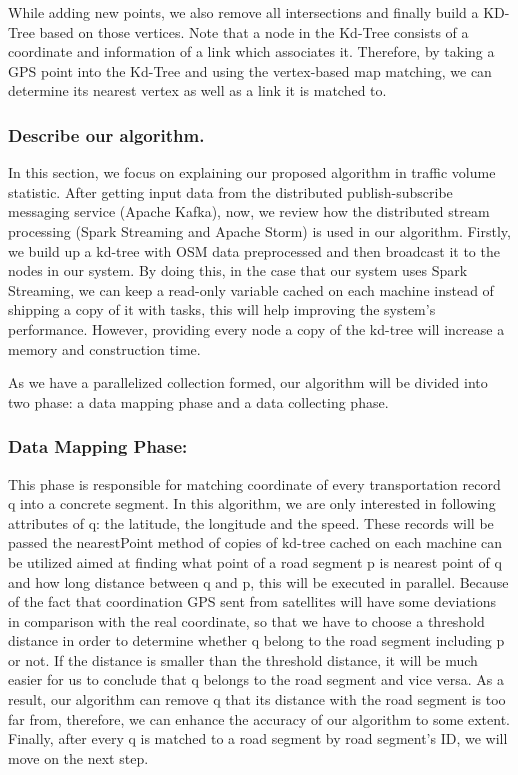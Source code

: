 \documentclass{acm_proc_article-sp}
\begin{document}
While adding new points, we also remove all intersections and finally build a KD-Tree based on those vertices. Note that a node in the Kd-Tree consists of a coordinate and information of a link which associates it. Therefore, by taking a GPS point into the Kd-Tree and using the vertex-based map matching, we can determine its nearest vertex as well as a link it is matched to.
	
\subsubsection{Describe our algorithm.}
		
In this section, we focus on explaining our proposed algorithm in traffic volume statistic. After getting input data from the distributed publish-subscribe messaging service (Apache Kafka), now, we review how the distributed stream processing (Spark Streaming and Apache Storm) is used in our algorithm. Firstly, we build up a kd-tree with OSM data preprocessed and then broadcast it to the nodes in our system. By doing this, in the case that our system uses Spark Streaming, we can keep a read-only variable cached on each machine instead of shipping a copy of it with tasks, this will help improving the system's performance. However, providing every node a copy of the kd-tree will increase a memory and construction time.
	
\setlength{\parindent}{0.7cm} As we have a parallelized collection formed, our algorithm will be divided into two phase: a data mapping phase and a data collecting phase. 

\subsubsection{Data Mapping Phase:} 
This phase is responsible for matching coordinate of every transportation record q into a concrete segment. In this algorithm, we are only interested in following attributes of q: the latitude, the longitude and the speed. These records will be passed the nearestPoint method of copies of kd-tree cached on each machine can be utilized aimed at finding what point of a road segment p is nearest point of q and how long distance between q and p, this will be executed in parallel. Because of the fact that coordination GPS sent from satellites will have some deviations in comparison with the real coordinate, so that we have to choose a threshold distance in order to determine whether q belong to the road segment including p or not. If the distance is smaller than the threshold distance, it will be much easier for us to conclude that q belongs to the road segment and vice versa. As a result, our algorithm can remove q that its distance with the road segment is too far from, therefore, we can enhance the accuracy of our algorithm to some extent. Finally, after every q is matched to a road segment by road segment's ID, we will move on the next step.
\end{document}
